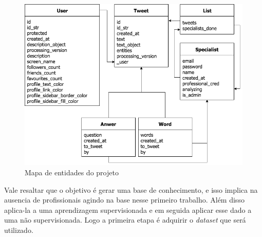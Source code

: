 \begin{figure}[!h]
    \centering
    \includegraphics[width=.65\textwidth]{imagens/entities.png}
    \caption{Mapa de entidades do projeto}
    \label{fig:entities}
\end{figure}

Vale resaltar que o objetivo é gerar uma base de conhecimento, e isso implica na ausencia de profissionais agindo na base nesse primeiro trabalho. Além disso aplica-la a uma aprendizagem supervisionada e em seguida aplicar esse dado a uma não supervisionada. Logo a primeira etapa é adquirir o \textit{dataset} que será utilizado.




